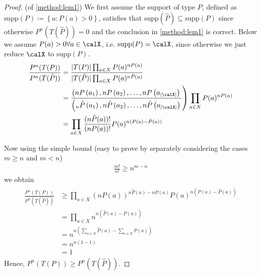 \documentclass{article}
\begin{document}
\begin{proof}{(of \cref{method:lem1})}
We first assume the support of type $P$, defined as $\text{supp}(P)\coloneqq \left\{a:P(a)>0\right\}$, satisfies that $\text{supp}(\hat{P})\subseteq \text{supp}(P)$ since otherwise $P^{n}(T(\hat{P}))=0$ and the conclusion in \cref{method:lem1} is correct. Below we assume $P(a)>0 \forall a \in \calX$, i.e. $\text{supp}(P)=\calX$, since otherwise we just reduce $\calX$ to $\text{supp}(P)$.
\begin{align*}
\begin{aligned}
\frac{P^{n}(T(P))}{P^{n}(T(\hat{P}))} &=\frac{|T(P)| \prod_{a \in X } P(a)^{n P(a)}}{|T(\hat{P})| \prod_{a \in X } P(a)^{n \hat{P}(a)}} \\
&\left.=\frac{\left(n P\left(a_{1}\right), n P\left(a_{2}\right), \ldots, n P\left(a_{| \calX |}\right)\right.}{\left(_{n} \hat{P}\left(a_{1}\right), n \hat{P}\left(a_{2}\right), \ldots, n \hat{P}\left(a_{| \calX |}\right)\right.}\right) \prod_{a \in X } P(a)^{n P(a)} \\
&=\prod_{a \in X } \frac{(n \hat{P}(a)) !}{(n P(a)) !} P(a)^{n(P(a)-\hat{P}(a))}
\end{aligned}
\end{align*}

Now using the simple bound (easy to prove by separately considering the cases $m \geq n$ and $m<n$)
\begin{align*}
\frac{m !}{n !} \geq n^{m-n}
\end{align*}
we obtain
\begin{align*}
\begin{aligned}
\frac{P^{n}(T(P))}{P^{n}(T(\hat{P}))} & \geq \prod_{a \in X }(n P(a))^{n \hat{P}(a)-n P(a)} P(a)^{n(P(a)-\hat{P}(a))} \\
&=\prod_{a \in X } n^{n(\hat{P}(a)-P(a))} \\
&=n^{n\left(\sum_{a \in X } \hat{P}(a)-\sum_{a \in X } P(a)\right)} \\
&=n^{n(1-1)} \\
&=1
\end{aligned}
\end{align*}
Hence, $P^{n}(T(P)) \geq P^{n}(T(\hat{P}))$. 
\end{proof}
\end{document}

